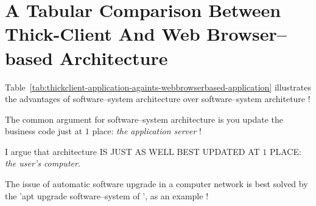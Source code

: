\section{A Tabular Comparison Between Thick-Client And Web Browser--based Architecture}
\begin{table}[!htbp]
\centering
{}
\caption{Thick--client application VS Web--browser--based application.\\}
\label{tab:thickclient-application-againts-webbrowserbased-application}
\end{table}

Table~\ref{tab:thickclient-application-againts-webbrowserbased-application}
illustrates the advantages of \thickclient
software--system architecture over \webbrowserbased
software--system architeture !
\newline

\textcolor{purplish}{
The common argument for \webbrowserbased software--system 
architecture is you update the business code just at $1$
place: \emph{the application server} !}

\textcolor{purplish}{
I argue that \thickclient architecture IS JUST AS WELL
BEST UPDATED AT $1$ PLACE: \emph{the user's computer}.}

\textcolor{purplish}{
The issue of automatic software upgrade in a computer
network is best solved by the 'apt upgrade software--system
of \debianlinux', as an example !
}